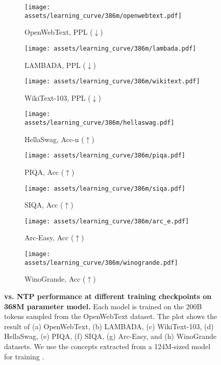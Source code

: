 \begin{figure*}[t]
\centering\small

\begin{subfigure}{0.245\textwidth}
    \texttt{[image: assets/learning\_curve/386m/openwebtext.pdf]}
    \caption{OpenWebText, PPL ($\downarrow$)}
\end{subfigure}
\begin{subfigure}{0.245\textwidth}
    \texttt{[image: assets/learning\_curve/386m/lambada.pdf]}
    \caption{LAMBADA, PPL ($\downarrow$)}
\end{subfigure}
\begin{subfigure}{0.245\textwidth}
    \texttt{[image: assets/learning\_curve/386m/wikitext.pdf]}
    \caption{WikiText-103, PPL ($\downarrow$)}
\end{subfigure}
\begin{subfigure}{0.245\textwidth}
    \texttt{[image: assets/learning\_curve/386m/hellaswag.pdf]}
    \caption{HellaSwag, Acc-n ($\uparrow$)}
\end{subfigure}
\begin{subfigure}{0.245\textwidth}
    \texttt{[image: assets/learning\_curve/386m/piqa.pdf]}
    \caption{PIQA, Acc ($\uparrow$)}
\end{subfigure}
\begin{subfigure}{0.245\textwidth}
    \texttt{[image: assets/learning\_curve/386m/siqa.pdf]}
    \caption{SIQA, Acc ($\uparrow$)}
\end{subfigure}
\begin{subfigure}{0.245\textwidth}
    \texttt{[image: assets/learning\_curve/386m/arc\_e.pdf]}
    \caption{Arc-Easy, Acc ($\uparrow$)}
\end{subfigure}
\begin{subfigure}{0.245\textwidth}
    \texttt{[image: assets/learning\_curve/386m/winogrande.pdf]}
    \caption{WinoGrande, Acc ($\uparrow$)}
\end{subfigure}
\caption{
\textbf{\sname vs. NTP performance at different training checkpoints on 368M parameter model.} Each model is trained on the 200B tokens sampled from the OpenWebText dataset. The plot shows the result of (a) OpenWebText, (b) LAMBADA, (c) WikiText-103, (d) HellaSwag, (e) PIQA, (f) SIQA, (g) Arc-Easy, and (h) WinoGrande datasets. We use the concepts extracted from a 124M-sized model for training \sname.
}

\label{fig:downstream_curve_386m}
\end{figure*}
